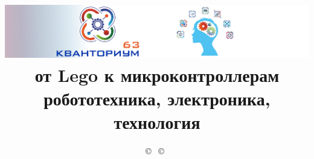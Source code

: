 

\title{\includegraphics[width=\textwidth]{img/logo63.png}\\
{\Huge от Lego к микроконтроллерам}\\
робототехника, электроника, технология}

\author{ 
\copyright\ 
\copyright\ 
}



\maketitle

\def\contentsname{\empty}
\tableofcontents\secdown























